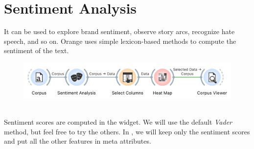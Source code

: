 \chapter{Sentiment Analysis}

 It can be used to explore brand sentiment, observe story arcs, recognize hate speech, and so on. Orange uses simple lexicon-based methods to compute the sentiment of the text.

\vspace{-0.2cm}
\begin{figure}[h]
  \centering
  \includegraphics[width=0.9\linewidth]{workflow.png}%
  \caption{$\;$}
\end{figure}
\vspace{-0.3cm}

Sentiment scores are computed in the  widget. We will use the default \emph{Vader} method, but feel free to try the others. In , we will keep only the sentiment scores and put all the other features in meta attributes.

